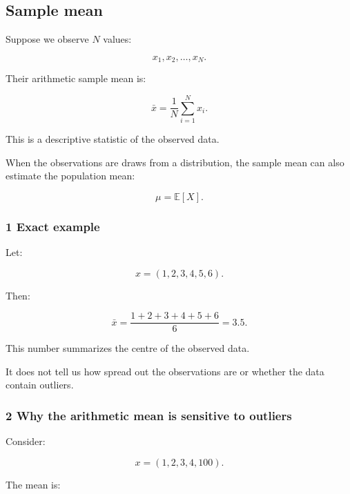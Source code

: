 \hypertarget{02-foundations-ii-ch030-finite-samples-need-stable-descriptive-statistics}{}

\subsection{Sample mean}\label{02-foundations-ii-ch030-sample-mean}

\hypertarget{02-foundations-ii-ch030-sample-mean}{}

Suppose we observe \(N\) values:

\[
 x_1,x_2,\ldots,x_N.
\]

Their arithmetic sample mean is:

\[
 \boxed{ \bar x=\frac1N\sum_{i=1}^{N}x_i }.
\]

This is a descriptive statistic of the observed data.

When the observations are draws from a distribution, the sample mean can also estimate the population mean:

\[
 \mu=\mathbb E[X].
\]

\subsubsection{1 Exact example}\label{02-foundations-ii-ch030-exact-example}

\hypertarget{02-foundations-ii-ch030-exact-example}{}

Let:

\[
 x=(1,2,3,4,5,6).
\]

Then:

\[
 \bar x= \frac{1+2+3+4+5+6}{6} =\boxed{3.5}.
\]

This number summarizes the centre of the observed data.

It does not tell us how spread out the observations are or whether the data contain outliers.

\subsubsection{2 Why the arithmetic mean is sensitive to outliers}\label{02-foundations-ii-ch030-why-the-arithmetic-mean-is-sensitive-to-outliers}

\hypertarget{02-foundations-ii-ch030-why-the-arithmetic-mean-is-sensitive-to-outliers}{}

Consider:

\[
 x=(1,2,3,4,100).
\]

The mean is:

